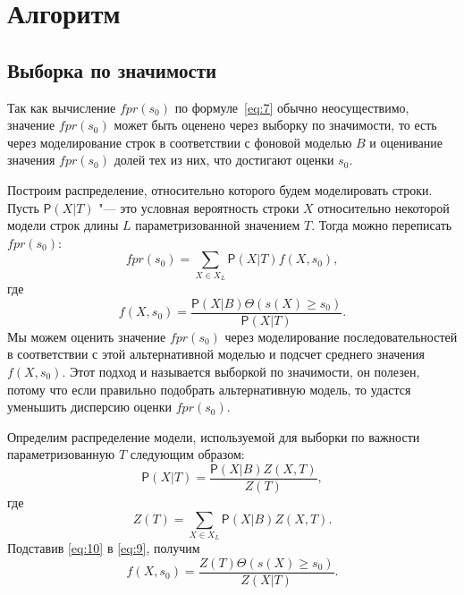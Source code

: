 \documentclass[specialist,
substylefile = spbu_report.rtx,
subf,href,colorlinks=true, 12pt]{disser}
\begin{document}
		\section{Алгоритм}
			\subsection{Выборка по значимости}
				Так как вычисление $fpr(s_{0})$ по формуле~\eqref{eq:7} обычно неосуществимо, значение $fpr(s_{0})$ может быть оценено через выборку по значимости, то есть через моделирование строк в соответствии с фоновой моделью $B$ и оценивание значения $fpr(s_{0})$ долей тех из них, что достигают оценки $s_{0}$.
				
				Построим распределение, относительно которого будем моделировать строки. Пусть $\mathsf{P}(X|T)$ "--- это условная вероятность строки $X$ относительно некоторой модели строк длины $L$ параметризованной значением $T$. Тогда можно переписать $fpr(s_{0})$:
				\begin{equation*}
					fpr(s_{0}) = \sum_{X \in X_{L}} \mathsf{P}(X|T) f(X,s_{0}),
					\label{eq:8}
				\end{equation*}
				где
				\begin{equation}
					f(X,s_{0}) = \frac{\mathsf{P}(X|B) \Theta(s(X) \geq s_{0})}{\mathsf{P}(X|T)}.
					\label{eq:9}
				\end{equation}
				Мы можем оценить значение $fpr(s_{0})$ через моделирование последовательностей в соответствии с этой альтернативной моделью и подсчет среднего значения $f(X,s_{0})$. Этот подход и называется выборкой по значимости, он полезен, потому что если правильно подобрать альтернативную модель, то удастся уменьшить дисперсию оценки $fpr(s_{0})$.
					
				Определим распределение модели, используемой для выборки по важности параметризованную $T$ следующим образом:
				\begin{equation}
					\mathsf{P}(X|T) = \frac{\mathsf{P}(X|B)Z(X,T)}{Z(T)},
					\label{eq:10}
				\end{equation}							
				где 
				\begin{equation}
					Z(T) = \sum_{X \in X_{L}}\mathsf{P}(X|B)Z(X,T).
					\label{eq:11}
				\end{equation}	
				Подставив \eqref{eq:10} в \eqref{eq:9}, получим 
				\begin{equation*}
					f(X,s_{0}) = \frac{Z(T)\Theta(s(X) \geq s_{0})}{Z(X|T)}.
					\label{eq:12}
				\end{equation*}		
		
\end{document}
